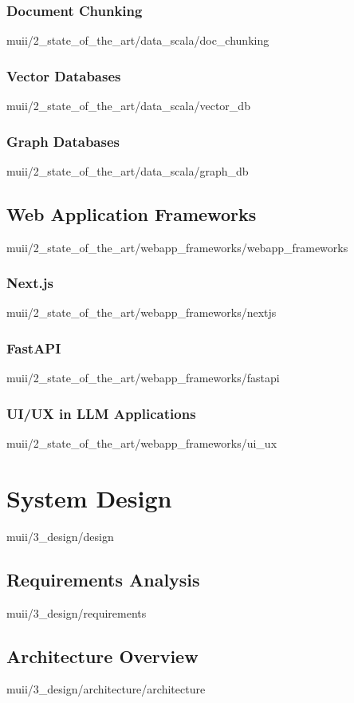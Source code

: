\documentclass[english,epsbased,copyright,final,printable,covers,extendedindex,firstnumbered,tfm,gnuplot,loc,lof,lot]{tfgtfmthesisuam}
\begin{document}
      \subsection{Document Chunking\label{SS:CHUNKING}}{muii/2_state_of_the_art/data_scala/doc_chunking}
      \subsection{Vector Databases\label{SS:VECTORSTORE}}{muii/2_state_of_the_art/data_scala/vector_db}
      \subsection{Graph Databases\label{SS:GRAPHDB}}{muii/2_state_of_the_art/data_scala/graph_db}

    \section{Web Application Frameworks\label{SEC:WEBAPP_FRAMEWORKS}}{muii/2_state_of_the_art/webapp_frameworks/webapp_frameworks}
      \subsection{Next.js\label{SS:NEXTJS}}{muii/2_state_of_the_art/webapp_frameworks/nextjs}
      \subsection{FastAPI\label{SS:FASTAPI}}{muii/2_state_of_the_art/webapp_frameworks/fastapi}
      \subsection{UI/UX in LLM Applications\label{SS:USER_INTERFACE}}{muii/2_state_of_the_art/webapp_frameworks/ui_ux}

  \chapter{System Design\label{CAP:DESIGN}}{muii/3_design/design}
    \section{Requirements Analysis\label{SEC:REQUIREMENTS}}{muii/3_design/requirements}

    \section{Architecture Overview\label{SEC:ARCH}}{muii/3_design/architecture/architecture}
\end{document}
